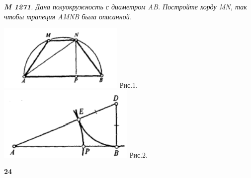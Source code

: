 

% 
\begin{minipage}{0.25\textwidth}

    
    \vspace{19.3cm} 
    \it \textbf{M 1271}. Дана полуокружность с диаметром AB. Постройте хорду MN, так чтобы трапеция AMNB была описанной.
    
    \includegraphics[scale=1.2]{pic1.png}
    Рис.1.
    \includegraphics[scale=1.2]{pic2.png}
    Рис.2.
    
    \vspace{6pt}
    \Huge \bf 24
    
    
    \end{minipage} 
    \hspace{0.8cm}
